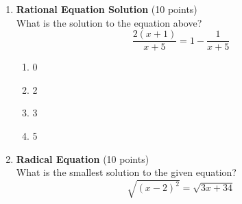 \begin{enumerate}
  \item \textbf{Rational Equation Solution} (10 points)\\
  What is the solution to the equation above?
  \[
  \frac{2(x+1)}{x+5}=1-\frac{1}{x+5}
  \]
  \begin{enumerate}[label=(\Alph*)]
    \item 0
    \item 2
    \item 3
    \item 5
  \end{enumerate}
  \begin{subanswer}
  \end{subanswer}

  \item \textbf{Radical Equation} (10 points)\\
  What is the smallest solution to the given equation?
  \[
  \sqrt{(x-2)^{2}}=\sqrt{3 x+34}
  \]
  \begin{subanswer}
  \end{subanswer}
\end{enumerate}


